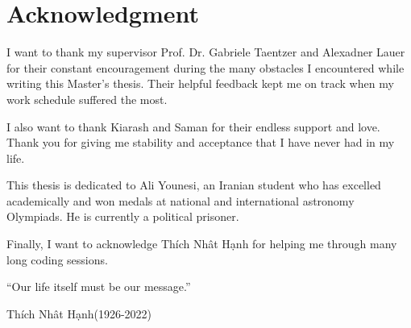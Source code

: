 \newpage
\section*{Acknowledgment}
I want to thank my supervisor Prof. Dr. Gabriele Taentzer and Alexadner Lauer for their constant encouragement during the many obstacles I encountered while writing this Master's thesis. Their helpful feedback kept me on track when my work schedule suffered the most.

I also want to thank Kiarash and Saman for their endless support and love. Thank you for giving me stability and acceptance that I have never had in my life.

This thesis is dedicated to Ali Younesi, an Iranian student who has excelled academically and won medals at national and international astronomy Olympiads. He is currently a political prisoner.

Finally, I want to acknowledge Th\'{i}ch Nh\^{a}t H\d{a}nh for helping me through many long coding sessions.
\newline
\newline
\newline
\newline
\newline
\newline
\newline
\newline
\newline
\newline
\newline
\begin{center}
\enquote{Our life itself must be our message.}
\end{center}
\begin{center}
Th\'{i}ch Nh\^{a}t H\d{a}nh(1926-2022)
\end{center}

